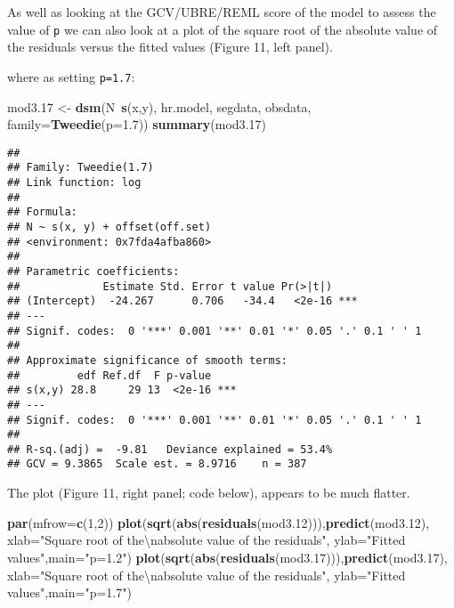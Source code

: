 \documentclass[]{article}
\newenvironment{Shaded}{}{}
\newcommand{\KeywordTok}[1]{\textcolor[rgb]{0.00,0.44,0.13}{\textbf{{#1}}}}
\newcommand{\DataTypeTok}[1]{\textcolor[rgb]{0.56,0.13,0.00}{{#1}}}
\newcommand{\DecValTok}[1]{\textcolor[rgb]{0.25,0.63,0.44}{{#1}}}
\newcommand{\FloatTok}[1]{\textcolor[rgb]{0.25,0.63,0.44}{{#1}}}
\newcommand{\CharTok}[1]{\textcolor[rgb]{0.25,0.44,0.63}{{#1}}}
\newcommand{\StringTok}[1]{\textcolor[rgb]{0.25,0.44,0.63}{{#1}}}
\newcommand{\NormalTok}[1]{{#1}}
\begin{document}
As well as looking at the GCV/UBRE/REML score of the model to assess the
value of \texttt{p} we can also look at a plot of the square root of the
absolute value of the residuals versus the fitted values (Figure 11,
left panel).

where as setting \texttt{p=1.7}:

\begin{Shaded}
\begin{Highlighting}[]
\NormalTok{mod3}\FloatTok{.17} \NormalTok{<-}\StringTok{ }\KeywordTok{dsm}\NormalTok{(N~}\KeywordTok{s}\NormalTok{(x,y), hr.model, segdata, obsdata,}
            \DataTypeTok{family=}\KeywordTok{Tweedie}\NormalTok{(}\DataTypeTok{p=}\FloatTok{1.7}\NormalTok{))}
\KeywordTok{summary}\NormalTok{(mod3}\FloatTok{.17}\NormalTok{)}
\end{Highlighting}
\end{Shaded}

\begin{verbatim}
## 
## Family: Tweedie(1.7) 
## Link function: log 
## 
## Formula:
## N ~ s(x, y) + offset(off.set)
## <environment: 0x7fda4afba860>
## 
## Parametric coefficients:
##             Estimate Std. Error t value Pr(>|t|)    
## (Intercept)  -24.267      0.706   -34.4   <2e-16 ***
## ---
## Signif. codes:  0 '***' 0.001 '**' 0.01 '*' 0.05 '.' 0.1 ' ' 1
## 
## Approximate significance of smooth terms:
##         edf Ref.df  F p-value    
## s(x,y) 28.8     29 13  <2e-16 ***
## ---
## Signif. codes:  0 '***' 0.001 '**' 0.01 '*' 0.05 '.' 0.1 ' ' 1
## 
## R-sq.(adj) =  -9.81   Deviance explained = 53.4%
## GCV = 9.3865  Scale est. = 8.9716    n = 387
\end{verbatim}

The plot (Figure 11, right panel; code below), appears to be much
flatter.

\begin{Shaded}
\begin{Highlighting}[]
\KeywordTok{par}\NormalTok{(}\DataTypeTok{mfrow=}\KeywordTok{c}\NormalTok{(}\DecValTok{1}\NormalTok{,}\DecValTok{2}\NormalTok{))}
\KeywordTok{plot}\NormalTok{(}\KeywordTok{sqrt}\NormalTok{(}\KeywordTok{abs}\NormalTok{(}\KeywordTok{residuals}\NormalTok{(mod3}\FloatTok{.12}\NormalTok{))),}\KeywordTok{predict}\NormalTok{(mod3}\FloatTok{.12}\NormalTok{),}
\DataTypeTok{xlab=}\StringTok{"Square root of the}\CharTok{\textbackslash{}n}\StringTok{absolute value of the residuals"}\NormalTok{,}
\DataTypeTok{ylab=}\StringTok{"Fitted values"}\NormalTok{,}\DataTypeTok{main=}\StringTok{"p=1.2"}\NormalTok{)}
\KeywordTok{plot}\NormalTok{(}\KeywordTok{sqrt}\NormalTok{(}\KeywordTok{abs}\NormalTok{(}\KeywordTok{residuals}\NormalTok{(mod3}\FloatTok{.17}\NormalTok{))),}\KeywordTok{predict}\NormalTok{(mod3}\FloatTok{.17}\NormalTok{),}
\DataTypeTok{xlab=}\StringTok{"Square root of the}\CharTok{\textbackslash{}n}\StringTok{absolute value of the residuals"}\NormalTok{,}
\DataTypeTok{ylab=}\StringTok{"Fitted values"}\NormalTok{,}\DataTypeTok{main=}\StringTok{"p=1.7"}\NormalTok{)}
\end{Highlighting}
\end{Shaded}
\end{document}
